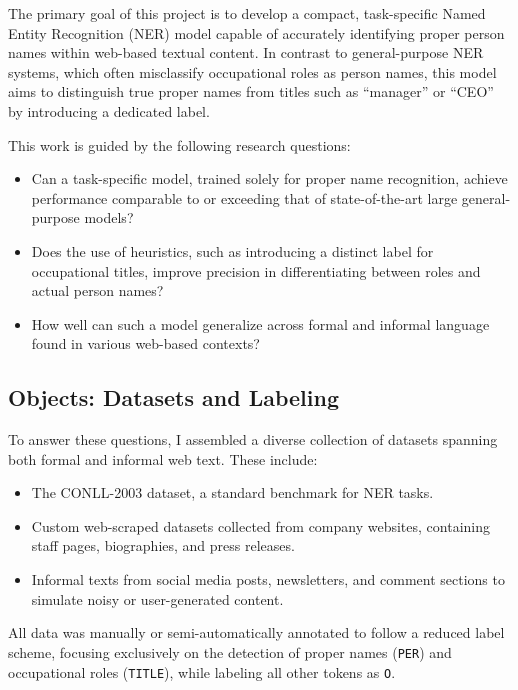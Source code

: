 \documentclass[a4paper]{usiinfbachelorproject}
\begin{document}
The primary goal of this project is to develop a compact, task-specific Named Entity Recognition (NER) model capable of accurately identifying proper person names within web-based textual content. In contrast to general-purpose NER systems, which often misclassify occupational roles as person names, this model aims to distinguish true proper names from titles such as “manager” or “CEO” by introducing a dedicated label.

This work is guided by the following research questions:

\begin{itemize}
  \item Can a task-specific model, trained solely for proper name recognition, achieve performance comparable to or exceeding that of state-of-the-art large general-purpose models?
  \item Does the use of heuristics, such as introducing a distinct label for occupational titles, improve precision in differentiating between roles and actual person names?
  \item How well can such a model generalize across formal and informal language found in various web-based contexts?
\end{itemize}

\subsection{Objects: Datasets and Labeling}

To answer these questions, I assembled a diverse collection of datasets spanning both formal and informal web text. These include:

\begin{itemize}
  \item The CONLL-2003 dataset, a standard benchmark for NER tasks.
  \item Custom web-scraped datasets collected from company websites, containing staff pages, biographies, and press releases.
  \item Informal texts from social media posts, newsletters, and comment sections to simulate noisy or user-generated content.
\end{itemize}

All data was manually or semi-automatically annotated to follow a reduced label scheme, focusing exclusively on the detection of proper names (\texttt{PER}) and occupational roles (\texttt{TITLE}), while labeling all other tokens as \texttt{O}.
\end{document}
